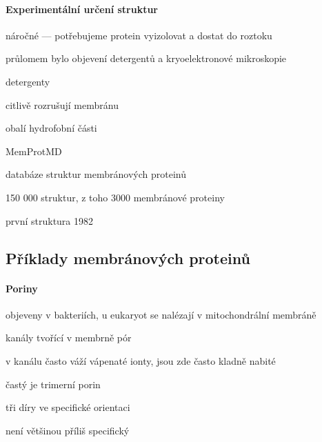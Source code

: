\documentclass[DIV=8]{scrreprt}
\begin{document}
\paragraph{Experimentální určení struktur}
\begin{myItemize}[nosep]
    \item náročné --- potřebujeme protein vyizolovat a dostat do roztoku
    \item průlomem bylo objevení detergentů a kryoelektronové mikroskopie
    \item detergenty
\begin{myItemize}[nosep]
    \item citlivě rozrušují membránu
    \item obalí hydrofobní části
\end{myItemize}

    \item MemProtMD
\begin{myItemize}[nosep]
    \item databáze struktur membránových proteinů
    \item 150 000 struktur, z toho 3000 membránové proteiny
    \item první struktura 1982
\end{myItemize}

\end{myItemize}



\subsection{Příklady membránových proteinů} \label{Příklady membránových proteinů}


\paragraph{Poriny}
\begin{myItemize}[nosep]
    \item objeveny v bakteriích, u eukaryot se nalézají v mitochondrální membráně
    \item kanály tvořící v membrně pór
    \item v kanálu často váží vápenaté ionty, jsou zde často kladně nabité
    \item častý je trimerní porin
\begin{myItemize}[nosep]
    \item tři díry ve specifické orientaci
    \item není většinou příliš specifický
\end{myItemize}

\end{myItemize}
\end{document}

